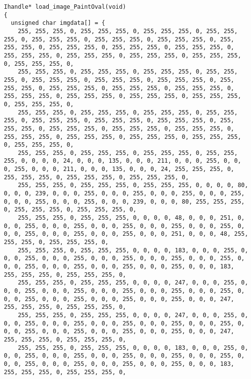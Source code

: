 \documentclass{ctexart}
\begin{document}
\begin{lstlisting}
Ihandle* load_image_PaintOval(void)
{
  unsigned char imgdata[] = {
    255, 255, 255, 0, 255, 255, 255, 0, 255, 255, 255, 0, 255, 255, 255, 0, 255, 255, 255, 0, 255, 255, 255, 0, 255, 255, 255, 0, 255, 255, 255, 0, 255, 255, 255, 0, 255, 255, 255, 0, 255, 255, 255, 0, 255, 255, 255, 0, 255, 255, 255, 0, 255, 255, 255, 0, 255, 255, 255, 0, 255, 255, 255, 0,
    255, 255, 255, 0, 255, 255, 255, 0, 255, 255, 255, 0, 255, 255, 255, 0, 255, 255, 255, 0, 255, 255, 255, 0, 255, 255, 255, 0, 255, 255, 255, 0, 255, 255, 255, 0, 255, 255, 255, 0, 255, 255, 255, 0, 255, 255, 255, 0, 255, 255, 255, 0, 255, 255, 255, 0, 255, 255, 255, 0, 255, 255, 255, 0,
    255, 255, 255, 0, 255, 255, 255, 0, 255, 255, 255, 0, 255, 255, 255, 0, 255, 255, 255, 0, 255, 255, 255, 0, 255, 255, 255, 0, 255, 255, 255, 0, 255, 255, 255, 0, 255, 255, 255, 0, 255, 255, 255, 0, 255, 255, 255, 0, 255, 255, 255, 0, 255, 255, 255, 0, 255, 255, 255, 0, 255, 255, 255, 0,
    255, 255, 255, 0, 255, 255, 255, 0, 255, 255, 255, 0, 255, 255, 255, 0, 0, 0, 0, 24, 0, 0, 0, 135, 0, 0, 0, 211, 0, 0, 0, 255, 0, 0, 0, 255, 0, 0, 0, 211, 0, 0, 0, 135, 0, 0, 0, 24, 255, 255, 255, 0, 255, 255, 255, 0, 255, 255, 255, 0, 255, 255, 255, 0,
    255, 255, 255, 0, 255, 255, 255, 0, 255, 255, 255, 0, 0, 0, 0, 80, 0, 0, 0, 239, 0, 0, 0, 255, 0, 0, 0, 255, 0, 0, 0, 255, 0, 0, 0, 255, 0, 0, 0, 255, 0, 0, 0, 255, 0, 0, 0, 239, 0, 0, 0, 80, 255, 255, 255, 0, 255, 255, 255, 0, 255, 255, 255, 0,
    255, 255, 255, 0, 255, 255, 255, 0, 0, 0, 0, 48, 0, 0, 0, 251, 0, 0, 0, 255, 0, 0, 0, 255, 0, 0, 0, 255, 0, 0, 0, 255, 0, 0, 0, 255, 0, 0, 0, 255, 0, 0, 0, 255, 0, 0, 0, 255, 0, 0, 0, 251, 0, 0, 0, 48, 255, 255, 255, 0, 255, 255, 255, 0,
    255, 255, 255, 0, 255, 255, 255, 0, 0, 0, 0, 183, 0, 0, 0, 255, 0, 0, 0, 255, 0, 0, 0, 255, 0, 0, 0, 255, 0, 0, 0, 255, 0, 0, 0, 255, 0, 0, 0, 255, 0, 0, 0, 255, 0, 0, 0, 255, 0, 0, 0, 255, 0, 0, 0, 183, 255, 255, 255, 0, 255, 255, 255, 0,
    255, 255, 255, 0, 255, 255, 255, 0, 0, 0, 0, 247, 0, 0, 0, 255, 0, 0, 0, 255, 0, 0, 0, 255, 0, 0, 0, 255, 0, 0, 0, 255, 0, 0, 0, 255, 0, 0, 0, 255, 0, 0, 0, 255, 0, 0, 0, 255, 0, 0, 0, 255, 0, 0, 0, 247, 255, 255, 255, 0, 255, 255, 255, 0,
    255, 255, 255, 0, 255, 255, 255, 0, 0, 0, 0, 247, 0, 0, 0, 255, 0, 0, 0, 255, 0, 0, 0, 255, 0, 0, 0, 255, 0, 0, 0, 255, 0, 0, 0, 255, 0, 0, 0, 255, 0, 0, 0, 255, 0, 0, 0, 255, 0, 0, 0, 255, 0, 0, 0, 247, 255, 255, 255, 0, 255, 255, 255, 0,
    255, 255, 255, 0, 255, 255, 255, 0, 0, 0, 0, 183, 0, 0, 0, 255, 0, 0, 0, 255, 0, 0, 0, 255, 0, 0, 0, 255, 0, 0, 0, 255, 0, 0, 0, 255, 0, 0, 0, 255, 0, 0, 0, 255, 0, 0, 0, 255, 0, 0, 0, 255, 0, 0, 0, 183, 255, 255, 255, 0, 255, 255, 255, 0,

\end{lstlisting}
\end{document}
